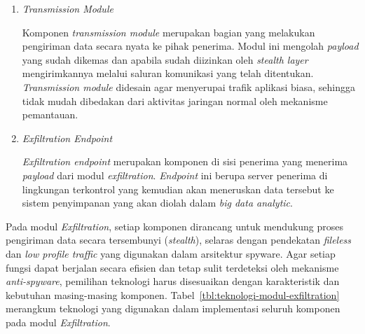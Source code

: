 \begin{enumerate}
    Komponen \textit{stealth \& environment check} yang memonitor kondisi lingkungan sebelum dan 
    selama proses eksfiltrasi. Komponen ini melakukan pengecekan terhadap indikator tertentu, seperti 
    beban CPU, ketersediaan jaringan, maupun adanya tanda-tanda lingkungan analisis (\textit{sandbox, debugger,} 
    atau \textit{monitoring} intensif). Hasil pengecekan ini digunakan sebagai \textit{constraint} 
    bagi \textit{exfiltration scheduler \& controller} dan \textit{transmission module}. Jika kondisi 
    tidak memenuhi kriteria \textit{stealth}, modul dapat menunda pengiriman, memperpanjang interval, 
    atau membatalkan proses eksfiltrasi untuk \textit{batch} tersebut.

    \item \textit{Transmission Module}
    
    Komponen \textit{transmission module} merupakan bagian yang melakukan pengiriman data 
    secara nyata ke pihak penerima. Modul ini mengolah \textit{payload} yang sudah dikemas 
    dan apabila sudah diizinkan oleh \textit{stealth layer} mengirimkannya melalui saluran 
    komunikasi yang telah ditentukan. \textit{Transmission module} didesain agar menyerupai 
    trafik aplikasi biasa, sehingga tidak mudah dibedakan dari aktivitas jaringan normal 
    oleh mekanisme pemantauan. 
    
    \item \textit{Exfiltration Endpoint}
    
    \textit{Exfiltration endpoint} merupakan komponen di sisi penerima yang menerima 
    \textit{payload} dari modul \textit{exfiltration}. \textit{Endpoint} ini berupa server 
    penerima di lingkungan terkontrol yang kemudian akan meneruskan data tersebut ke sistem 
    penyimpanan yang akan diolah dalam \textit{big data analytic}. 

\end{enumerate}

Pada modul \textit{Exfiltration}, setiap komponen dirancang untuk mendukung proses 
pengiriman data secara tersembunyi (\textit{stealth}), selaras dengan pendekatan 
\textit{fileless} dan \textit{low profile traffic} yang digunakan dalam arsitektur 
spyware. Agar setiap fungsi dapat berjalan secara efisien dan tetap sulit 
terdeteksi oleh mekanisme \textit{anti-spyware}, pemilihan teknologi harus 
disesuaikan dengan karakteristik dan kebutuhan masing-masing komponen. 
Tabel~\ref{tbl:teknologi-modul-exfiltration} merangkum teknologi yang digunakan dalam 
implementasi seluruh komponen pada modul \textit{Exfiltration}.

